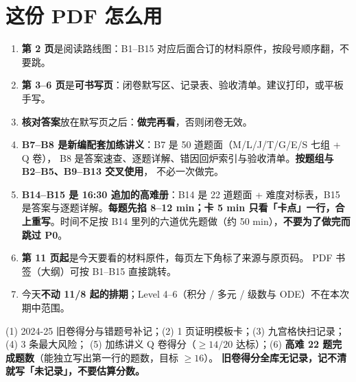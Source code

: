 \documentclass[10pt,a4paper]{ctexart}
\begin{document}
\section*{这份 PDF 怎么用}
\begin{enumerate}
\item \textbf{第 2 页}是阅读路线图：B1--B15 对应后面合订的材料原件，按段号顺序翻，不要跳。
\item \textbf{第 3--6 页}是\textbf{可书写页}：闭卷默写区、记录表、验收清单。建议打印，或平板手写。
\item \textbf{核对答案}放在默写页之后：\textbf{做完再看}，否则闭卷无效。
\item \textbf{B7--B8 是新编配套加练讲义}：B7 是 50 道题面（M/L/J/T/G/E/S 七组 + Q 卷），
      B8 是答案速查、逐题详解、错因回炉索引与验收清单。\textbf{按题组与 B2--B5、B9--B13 交叉使用}，
      不必一次做完。
\item \textbf{B14--B15 是 16:30 追加的高难册}：B14 是 22 道题面 + 难度对标表，B15 是答案与逐题详解。\textbf{每题先掐 8--12 min；卡 5 min 只看「卡点」一行，合上重写}。时间不足按 B14 里列的六道优先题做（约 50 min），\textbf{不要为了做完而跳过 P0}。
\item \textbf{第 11 页起}是今天要看的材料原件，每页左下角标了来源与原页码。
      PDF 书签（大纲）可按 B1--B15 直接跳转。
\item 今天\textbf{不动 11/8 起的排期}；Level 4--6（积分 / 多元 / 级数与 ODE）不在本次期中范围。
\end{enumerate}
\begin{warnbox}[产出（明天 11/8 的输入）]
(1) 2024-25 旧卷得分与错题号补记；(2) 1 页证明模板卡；(3) 九宫格快扫记录；(4) 3 条最大风险；
(5) 加练讲义 Q 卷得分（$\geq 14/20$ 达标）；(6) \textbf{高难 22 题完成题数}（能独立写出第一行的题数，目标 $\geq 16$）。
\textbf{旧卷得分全库无记录，记不清就写「未记录」，不要估算分数。}
\end{warnbox}

\clearpage
\end{document}

